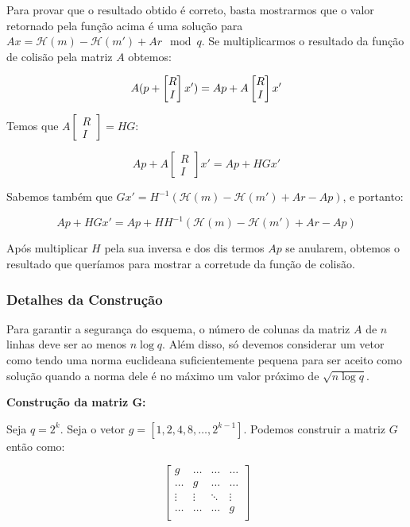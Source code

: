 \documentclass[a4paper]{article}
\begin{document}
Para provar que o resultado obtido é correto, basta mostrarmos que o
valor retornado pela função acima é uma solução para $Ax =
\mathcal{H}(m) - \mathcal{H}(m') + Ar \mod q$. Se multiplicarmos o
resultado da função de colisão pela matriz $A$ obtemos:

$$ A(p+\left[\begin{matrix}R\\I\end{matrix}\right]x') = Ap +
A\left[\begin{matrix}R\\I\end{matrix}\right]x'\\
$$

Temos que $A\left[\begin{matrix}R\\I\end{matrix}\right] = HG$:

$$
Ap + A\left[\begin{matrix}R\\I\end{matrix}\right]x' = Ap + HGx'
$$

Sabemos também que $Gx' = H^{-1}(\mathcal{H}(m) - \mathcal{H}(m') + Ar
- Ap)$, e portanto:

$$
Ap + HGx' = Ap + H H^{-1}(\mathcal{H}(m) - \mathcal{H}(m') + Ar - Ap)
$$

Após multiplicar $H$ pela sua inversa e dos dis termos $Ap$ se
anularem, obtemos o resultado que queríamos para mostrar a corretude
da função de colisão.

\subsubsection{Detalhes da Construção}

Para garantir a segurança do esquema, o número de colunas da matriz
$A$ de $n$ linhas deve ser ao menos $n\log q$. Além disso, só devemos
considerar um vetor como tendo uma norma euclideana suficientemente
pequena para ser aceito como solução quando a norma dele é no máximo
um valor próximo de $\sqrt{n \log q}$.

\textbf{Construção da matriz G:}

Seja $q=2^k$. Seja o vetor $g=[1, 2, 4, 8, \ldots, 2^{k-1}]$. Podemos
construir a matriz $G$ então como:

$$
\left[\begin{matrix}
    g & \ldots & \ldots & \ldots\\
    \ldots & g & \ldots & \ldots\\
    \vdots & \vdots & \ddots & \vdots\\
    \ldots & \ldots & \ldots & g\\
  \end{matrix}\right]
$$
\end{document}
